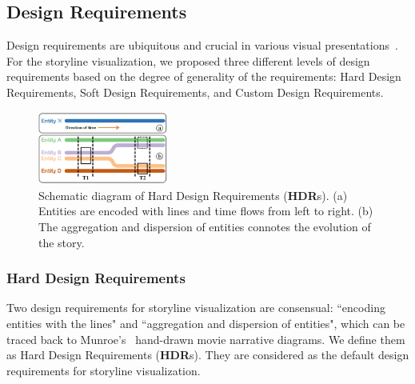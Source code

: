 \documentclass[review,journal]{vgtc}         %
\begin{document}
\subsection{Design Requirements}
\noindent Design requirements are ubiquitous and crucial in various visual presentations~\cite{tanahashi_design_2012}. For the storyline visualization, we proposed three different levels of design requirements based on the degree of generality of the requirements: Hard Design Requirements, Soft Design Requirements, and Custom Design Requirements.

\begin{figure}[h]
	\centering
	\vspace{0em}	
	\includegraphics[width=0.38\textwidth]{Fig/HDR.pdf}
	\vspace{-0.5em}
	\caption{Schematic diagram of Hard Design Requirements (\textbf{HDR}s). (a) Entities are encoded with lines and time flows from left to right. (b) The aggregation and dispersion of entities connotes the evolution of the story.}
	\vspace{-0.5em}
	\label{fig:HDR}
\end{figure}

\subsubsection{Hard Design Requirements}
\noindent Two design requirements for storyline visualization are consensual: ``encoding entities with the lines" and ``aggregation and dispersion of entities", which can be traced back to Munroe's~\cite{munroe_movie_nodate} hand-drawn movie narrative diagrams. We define them as Hard Design Requirements (\textbf{HDR}s). They are considered as the default design requirements for storyline visualization.
\end{document}
